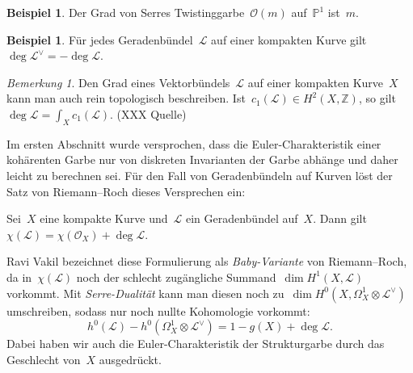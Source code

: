 \documentclass[a4paper,ngerman,12pt]{scrartcl}
\theoremstyle{definition}
\newtheorem{ex}[defn]{Beispiel}
\theoremstyle{plain}
\theoremstyle{remark}
\newtheorem{rem}[defn]{Bemerkung}
\newcommand{\ZZ}{\mathbb{Z}}
\newcommand{\PP}{\mathbb{P}}
\renewcommand{\L}{\mathcal{L}}
\renewcommand{\O}{\mathcal{O}}
\begin{document}
\begin{ex}Der Grad von Serres Twistinggarbe~$\O(m)$ auf~$\PP^1$
ist~$m$.\end{ex}

\begin{ex}Für jedes Geradenbündel~$\L$ auf einer kompakten Kurve gilt
$\deg\L^\vee = -\deg\L$.\end{ex}

\begin{rem}Den Grad eines Vektorbündels~$\L$ auf einer kompakten Kurve~$X$ kann
man auch rein topologisch beschreiben. Ist~$c_1(\L) \in H^2(X, \ZZ)$, so
gilt~$\deg\L = \int_X c_1(\L)$. (XXX Quelle)\end{rem}

Im ersten Abschnitt wurde versprochen, dass die Euler-Charakteristik einer
kohärenten Garbe nur von diskreten Invarianten der Garbe abhänge und daher
leicht zu berechnen sei. Für den Fall von Geradenbündeln auf Kurven löst der
Satz von Riemann--Roch dieses Versprechen ein:

\begin{thm}
Sei~$X$ eine kompakte Kurve und~$\L$ ein Geradenbündel auf~$X$. Dann gilt
$\chi(\L) = \chi(\O_X) + \deg\L$.
\end{thm}

Ravi Vakil bezeichnet diese Formulierung als \emph{Baby-Variante} von Riemann--Roch, da
in~$\chi(\L)$ noch der schlecht zugängliche Summand~$\dim H^1(X,\L)$ vorkommt.
Mit \emph{Serre-Dualität} kann man diesen noch zu~$\dim H^0(X,\Omega^1_X
\otimes \L^\vee)$ umschreiben, sodass nur noch
nullte Kohomologie vorkommt:
\[ h^0(\L) - h^0(\Omega^1_X \otimes \L^\vee) = 1-g(X) + \deg\L. \]
Dabei haben wir auch die Euler-Charakteristik der Strukturgarbe durch das
Geschlecht von~$X$ ausgedrückt.
\end{document}
